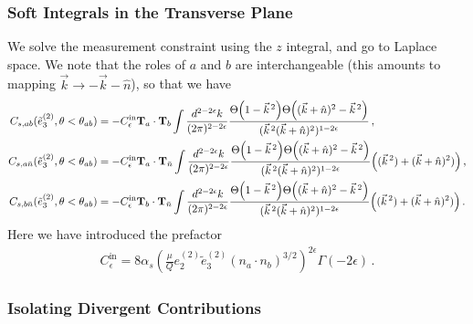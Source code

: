 \documentclass[a4paper,11pt]{article}
\newcommand{\nbar}{{\bar n}}
\newcommand{\ecf}[2]{e_{#1}^{(#2)}}
\newcommand{\ecflp}[2]{\tilde e_{#1}^{(#2)}}
\newcommand{\nn}{\nonumber}
\def\nbar{\bar n}
\begin{document}
\subsubsection{Soft Integrals in the Transverse Plane}

We solve the measurement constraint using the $z$ integral, and go to Laplace space. We note that the roles of $a$ and $b$ are interchangeable (this amounts to mapping $\vec{k}\rightarrow-\vec{k}-\hat{n}$), so that we have
{\small\begin{align}\label{eq:collinear_soft_integrals_transverse}
C_{s, ab}(\ecflp{3}{2},\theta<\theta_{ab}) &= -C_{\epsilon}^{\text{in}}{\bf T}_a\cdot {\bf T}_b \int\frac{d^{2-2\epsilon}{k}}{(2\pi)^{2-2\epsilon}}\frac{\Theta\Big(1-\vec{k}^{\,2}\Big)\Theta\Big((\vec{k}+\hat{n})^2-\vec{k}^{\,2}\Big)}{(\vec{k}^{\,2}(\vec{k}+\hat{n})^2)^{1-2\epsilon}}\,,\\
C_{s, a\nbar}(\ecflp{3}{2},\theta<\theta_{ab}) &= -C_{\epsilon}^{\text{in}}{\bf T}_a\cdot {\bf T}_{\nbar} \int\frac{d^{2-2\epsilon}{k}}{(2\pi)^{2-2\epsilon}}\frac{\Theta\Big(1-\vec{k}^{\,2}\Big)\Theta\Big((\vec{k}+\hat{n})^2-\vec{k}^{\,2}\Big)}{(\vec{k}^{\,2}(\vec{k}+\hat{n})^2)^{1-2\epsilon}}\Big((\vec{k}^{\,2})+(\vec{k}+\hat{n})^2)\Big)\,,\nonumber\\
C_{s, b\nbar}(\ecflp{3}{2},\theta<\theta_{ab}) &= -C_{\epsilon}^{\text{in}}{\bf T}_b\cdot {\bf T}_{\nbar} \int\frac{d^{2-2\epsilon}{k}}{(2\pi)^{2-2\epsilon}}\frac{\Theta\Big(1-\vec{k}^{\,2}\Big)\Theta\Big((\vec{k}+\hat{n})^2-\vec{k}^{\,2}\Big)}{(\vec{k}^{\,2}(\vec{k}+\hat{n})^2)^{1-2\epsilon}}\Big((\vec{k}^{\,2})+(\vec{k}+\hat{n})^2)\Big)\,. \nn
\end{align}}
Here we have introduced the prefactor
\begin{align}
C_{\epsilon}^{\text{in}}=8\alpha_s\left(\frac{\mu}{Q}\ecf{2}{2}\ecflp{3}{2}(n_a\cdot n_b)^{3/2}\right)^{2\epsilon}\Gamma(-2\epsilon)\,.
\end{align}

\subsubsection{Isolating Divergent Contributions}
\end{document}
